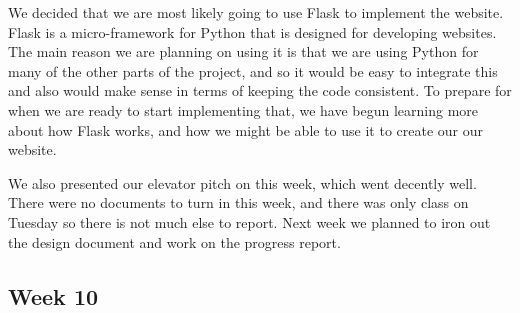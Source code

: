 \documentclass[letterpaper,10pt]{article}
\begin{document}
We decided that we are most likely going to use Flask to implement the website. Flask is a micro-framework for Python that is designed for developing websites. The main reason we are planning on using it is that we are using Python for many of the other parts of the project, and so it would be easy to integrate this and also would make sense in terms of keeping the code consistent. To prepare for when we are ready to start implementing that, we have begun learning more about how Flask works, and how we might be able to use it to create our our website.

We also presented our elevator pitch on this week, which went decently well. There were no documents to turn in this week, and there was only class on Tuesday so there is not much else to report. Next week we planned to iron out the design document and work on the progress report. 

\subsection{Week 10}
\end{document}
